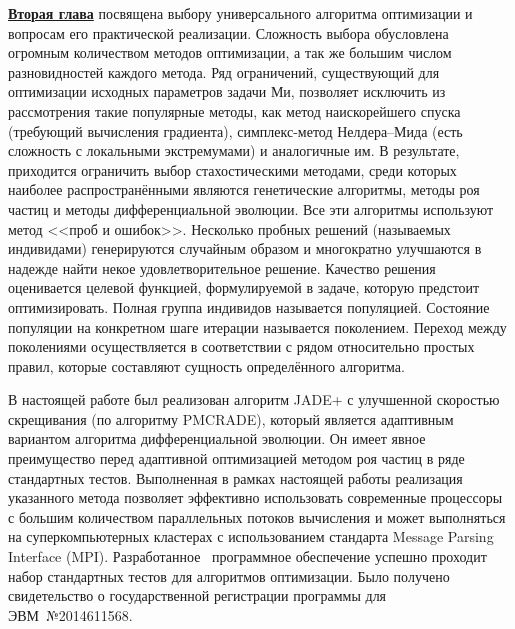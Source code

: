 \underline{\textbf{Вторая глава}} посвящена выбору универсального
алгоритма оптимизации и вопросам его практической
реализации. Сложность выбора обусловлена огромным количеством методов
оптимизации, а так же большим числом разновидностей каждого
метода. Ряд ограничений, существующий для оптимизации исходных
параметров задачи Ми, позволяет исключить из рассмотрения такие
популярные методы, как метод наискорейшего спуска (требующий
вычисления градиента), симплекс-метод Нелдера--Мида (есть сложность с
локальными экстремумами) и аналогичные им. В результате, приходится
ограничить выбор стахостическими методами, среди которых наиболее
распространёнными являются генетические алгоритмы, методы роя частиц и
методы дифференциальной эволюции.  Все эти алгоритмы используют метод
<<проб и ошибок>>.  Несколько пробных решений (называемых индивидами)
генерируются случайным образом и многократно улучшаются в надежде
найти некое удовлетворительное решение. Качество решения оценивается
целевой функцией, формулируемой в задаче, которую предстоит
оптимизировать.  Полная группа индивидов называется популяцией.
Состояние популяции на конкретном шаге итерации называется поколением.
Переход между поколениями осуществляется в соответствии с рядом
относительно простых правил, которые составляют сущность определённого
алгоритма.


В настоящей работе был реализован алгоритм JADE+ с улучшенной
скоростью скрещивания (по алгоритму PMCRADE), который является
адаптивным вариантом алгоритма дифференциальной эволюции. Он имеет
явное преимущество перед адаптивной оптимизацией методом роя частиц в
ряде стандартных тестов.  Выполненная в рамках настоящей работы
реализация указанного метода позволяет эффективно использовать
современные процессоры с большим количеством параллельных потоков
вычисления и может выполняться на суперкомпьютерных кластерах с
использованием стандарта Message Parsing Interface (MPI).
Разработанное~\cite{JADE-web} программное обеспечение успешно проходит
набор стандартных тестов для алгоритмов оптимизации.  Было получено
свидетельство о государственной регистрации программы для
ЭВМ~№2014611568.



